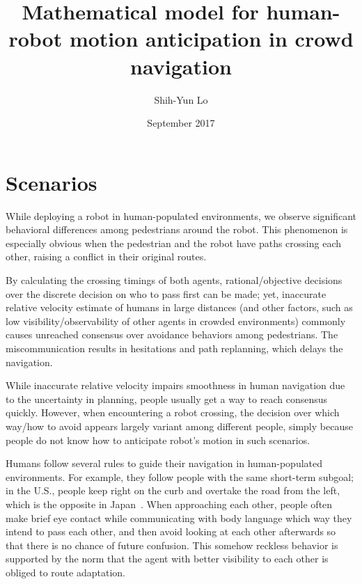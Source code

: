 \documentclass{article}
\title{Mathematical model for human-robot motion anticipation in crowd navigation}
\author{Shih-Yun Lo}
\date{September 2017}
\begin{document}
\maketitle

\section{Scenarios}
While deploying a robot in human-populated environments, we observe significant behavioral differences among pedestrians around the robot. This phenomenon is especially obvious when the pedestrian and the robot have paths crossing each other, raising a conflict in their original routes. 

By calculating the crossing timings of both agents, rational/objective decisions over the discrete decision on who to pass first can be made; yet, inaccurate relative velocity estimate of humans in large distances (and other factors, such as low visibility/observability of other agents in crowded environments) commonly causes unreached consensus over avoidance behaviors among pedestrians. The miscommunication results in hesitations and path replanning, which delays the navigation.

While inaccurate relative velocity impairs smoothness in human navigation due to the uncertainty in planning, people usually get a way to reach consensus quickly. However, when encountering a robot crossing, the decision over which way/how to avoid appears largely variant among different people, simply because people do not know how to anticipate robot's motion in such scenarios.

Humans follow several rules to guide their navigation in human-populated 
environments. For example, they follow people with the same short-term 
subgoal; in the U.S., people keep right on the curb and overtake the road from 
the left, which is the opposite in Japan~\cite{zanlungo2012microscopic}. When 
approaching each other, people often make brief eye contact while 
communicating with body language which way they intend to pass each other, and 
then avoid looking at each other afterwards so that there is no chance of 
future confusion.
This somehow reckless behavior is supported by the norm that the agent with better visibility to each other is obliged to route adaptation.
\end{document}
